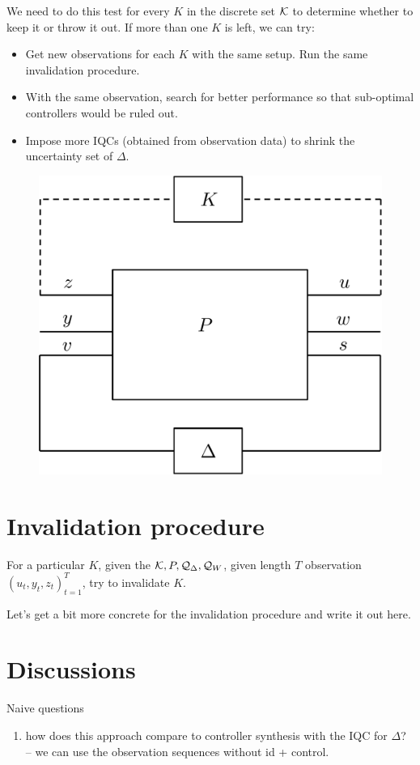 \documentclass[11pt, onecolumn]{article}
\begin{document}
We need to do this test for every $K$ in the discrete set $\mathcal K$ to determine whether to keep it or
throw it out. If more than one $K$ is left, we can try:
\begin{itemize}
\item Get new observations for each $K$ with the same setup. Run the same invalidation procedure.
\item With the same observation, search for better performance so that sub-optimal controllers would
  be ruled out.
\item Impose more IQCs (obtained from observation data) to shrink the uncertainty set of $\Delta$.
\end{itemize}



\begin{figure}[h!]
  \centering
  \includegraphics[width=.3\linewidth]{sys1.pdf}
\end{figure}


\section{Invalidation procedure}

For a particular $K$, given the $\mathcal K,P, \mathcal Q_{\Delta}, \mathcal Q_{W}$, given length $T$ observation
$(u_t, y_t, z_t)_{t=1}^{T}$, try to invalidate $K$.

Let's get a bit more concrete for the invalidation procedure and write it out here.

\section{Discussions}

Naive questions
\begin{enumerate}
\item how does this approach compare to controller synthesis with the IQC for $\Delta$? -- we can
  use the observation sequences without id + control.
\end{enumerate}
\end{document}
